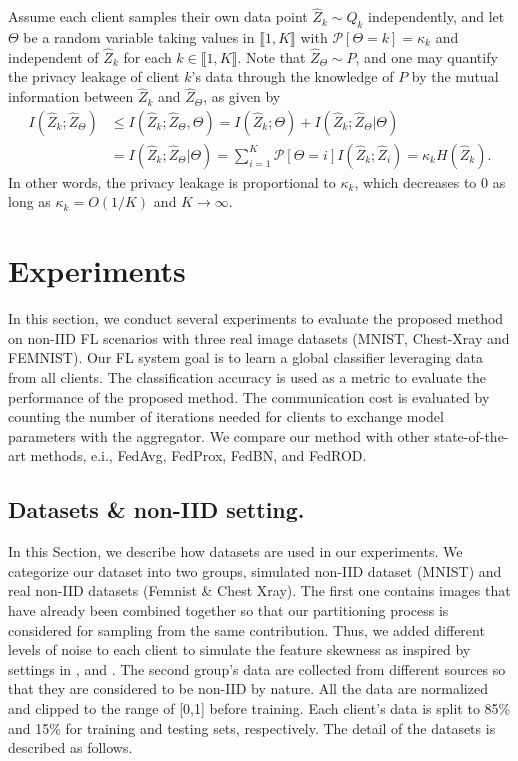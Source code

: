 \documentclass[mathfont=newtx]{uai2023} %
\newcommand{\prob}{\mathcal{P} }
\begin{document}
Assume each client samples their own data point ${\hat Z}_k \sim Q_k$ independently, and let  $\Theta$ be a random variable taking values in $\llbracket 1,K \rrbracket$ with $\prob[\Theta = k] = \kappa_k$ and independent of ${\hat Z}_k$ for each $k \in \llbracket 1,K \rrbracket$. Note that ${\hat Z}_\Theta \sim P$, and one may quantify the privacy leakage of client $k$'s data through the knowledge of $P$ by the mutual  information between ${\hat Z}_k$ and ${\hat Z}_\Theta$, as given by
\begin{equation}
\begin{aligned}
I({\hat Z}_k;{\hat Z}_\Theta) & \leq I({\hat Z}_k;{\hat Z}_\Theta, \Theta)
   =  I({\hat Z}_k; \Theta) + I({\hat Z}_k;{\hat Z}_\Theta | \Theta)
   \\ &= I({\hat Z}_k;{\hat Z}_\Theta | \Theta) = \sum_{i=1}^K \prob[\Theta = i] I({\hat Z}_k;{\hat Z}_i) = \kappa_k H({\hat Z}_k).
\end{aligned}
\end{equation}
%
In other words, the privacy leakage is proportional to $\kappa_k$, which decreases to $0$ as long as $\kappa_k = O(1/K)$ and $K \rightarrow \infty$.

\section{Experiments}
\label{sec:experiments}
In this section, we conduct several experiments to evaluate the proposed method on non-IID FL scenarios with three real image datasets (MNIST, Chest-Xray and FEMNIST). Our FL system goal is to learn a global classifier leveraging data from all clients. The classification accuracy is used as a metric to evaluate the performance of the proposed method. The communication cost is evaluated by counting the number of iterations needed for clients to exchange model parameters with the aggregator. We compare our method with other state-of-the-art methods, e.i., FedAvg, FedProx, FedBN, and FedROD. 

\subsection{Datasets \& non-IID setting.}
In this Section, we describe how datasets are used in our experiments. We categorize our dataset into two groups, simulated non-IID dataset (MNIST) and real non-IID datasets (Femnist \& Chest Xray). The first one contains images that have already been combined together so that our partitioning process is considered for sampling from the same contribution. Thus, we added different levels of noise to each client to simulate the feature skewness as inspired by settings in \cite{abs-2102-02079}, and \cite{FedProto}. The second group's data are collected from different sources so that they are considered to be non-IID by nature. All the data are normalized and clipped to the range of [0,1] before training. Each client's data is split to 85\% and 15\% for training and testing sets, respectively. The detail of the datasets is described as follows.  
\end{document}
